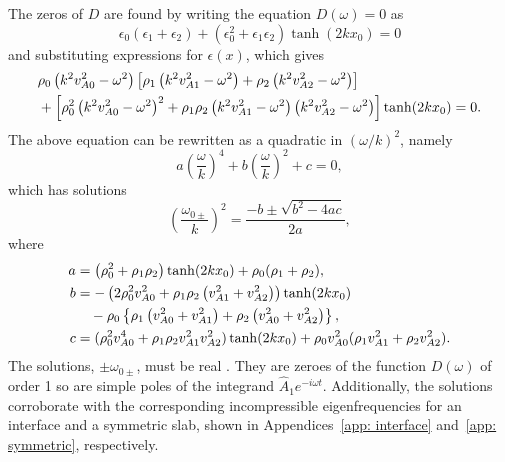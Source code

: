 \documentclass[12pt]{../style-files/ociamthesis}
\begin{document}
The zeros of $D$ are found by writing the equation $D(\omega) = 0$ as
\begin{equation}
\epsilon_0(\epsilon_1 + \epsilon_2) + \left(\epsilon_0^2 + \epsilon_1\epsilon_2\right)\tanh(2kx_0) = 0
\end{equation}
and substituting expressions for $\epsilon(x)$, which gives
\begin{align}
&\rho_0\left(k^2v_{A0}^2 - \omega^2\right)\left[\rho_1\left(k^2v_{A1}^2 - \omega^2\right) + \rho_2\left(k^2v_{A2}^2 - \omega^2\right)\right] \notag \\
&+ \left[\rho_0^2\left(k^2v_{A0}^2 - \omega^2\right)^2 + \rho_1\rho_2\left(k^2v_{A1}^2 - \omega^2\right)\left(k^2v_{A2}^2 - \omega^2\right)\right]\tanh(2kx_0) = 0.
\end{align}
The above equation can be rewritten as a quadratic in $(\omega/k)^2$, namely
\begin{equation}
a \left(\frac{\omega}{k}\right)^4 + b \left(\frac{\omega}{k}\right)^2 + c = 0,
\end{equation}
which has solutions
\begin{equation}
\left(\frac{\omega_{0\pm}}{k}\right)^2 = \frac{-b \pm \sqrt{b^2 - 4ac}}{2a},
\end{equation}
where
\begin{align}
a &= \left(\rho_0^2 + \rho_1\rho_2\right)\tanh(2kx_0) + \rho_0(\rho_1 + \rho_2), \label{solution a} \\
b &= -\left(2\rho_0^2v_{A0}^2 + \rho_1\rho_2\left(v_{A1}^2 + v_{A2}^2\right)\right)\tanh(2kx_0) \notag \\
& \quad - \rho_0 \left\{ \rho_1\left(v_{A0}^2 + v_{A1}^2\right) + \rho_2\left(v_{A0}^2 + v_{A2}^2\right) \right\}, \label{solution b} \\
c &= (\rho_0^2v_{A0}^4 + \rho_1\rho_2v_{A1}^2v_{A2}^2)\tanh(2kx_0) + \rho_0v_{A0}^2(\rho_1v_{A1}^2 + \rho_2v_{A2}^2). \label{solution c}
\end{align}
The solutions, $\pm\omega_{0\pm}$, must be real \citep{goe_etal04}. They are zeroes of the function $D(\omega)$ of order 1 so are simple poles of the integrand $\hat{A}_1 e^{-i\omega t}$. Additionally, the solutions corroborate with the corresponding incompressible eigenfrequencies for an interface and a symmetric slab, shown in Appendices~\ref{app: interface} and~\ref{app: symmetric}, respectively.
\end{document}
